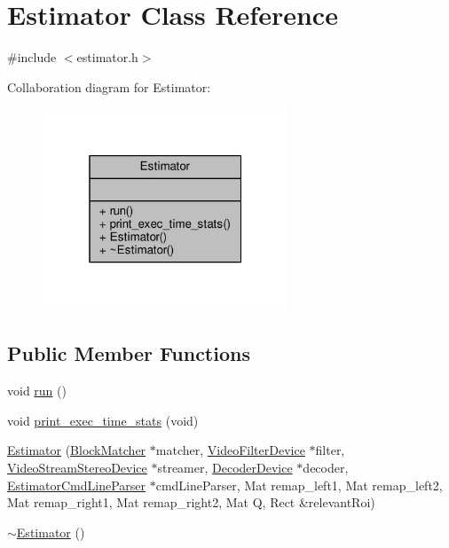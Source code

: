 \hypertarget{classEstimator}{}\section{Estimator Class Reference}
\label{classEstimator}


{\ttfamily \#include $<$estimator.\+h$>$}



Collaboration diagram for Estimator\+:
\nopagebreak
\begin{figure}[H]
\begin{center}
\leavevmode
\includegraphics[width=208pt]{classEstimator__coll__graph}
\end{center}
\end{figure}
\subsection*{Public Member Functions}
\begin{DoxyCompactItemize}
\item 
void \hyperlink{classEstimator_a62e5a27e7c36023542faf730a14a7955}{run} ()
\item 
void \hyperlink{classEstimator_a2987abc6ac6b7978f681771a9b917c78}{print\+\_\+exec\+\_\+time\+\_\+stats} (void)
\item 
\hyperlink{classEstimator_a9dd72c43c2c708c7ea431f6d7aca7753}{Estimator} (\hyperlink{classBlockMatcher}{Block\+Matcher} $\ast$matcher, \hyperlink{classVideoFilterDevice}{Video\+Filter\+Device} $\ast$filter, \hyperlink{classVideoStreamStereoDevice}{Video\+Stream\+Stereo\+Device} $\ast$streamer, \hyperlink{classDecoderDevice}{Decoder\+Device} $\ast$decoder, \hyperlink{classEstimatorCmdLineParser}{Estimator\+Cmd\+Line\+Parser} $\ast$cmd\+Line\+Parser, Mat remap\+\_\+left1, Mat remap\+\_\+left2, Mat remap\+\_\+right1, Mat remap\+\_\+right2, Mat Q, Rect \&relevant\+Roi)
\item 
\hyperlink{classEstimator_a782584ccab2264d6c294ad7294150428}{$\sim$\+Estimator} ()
\end{DoxyCompactItemize}



